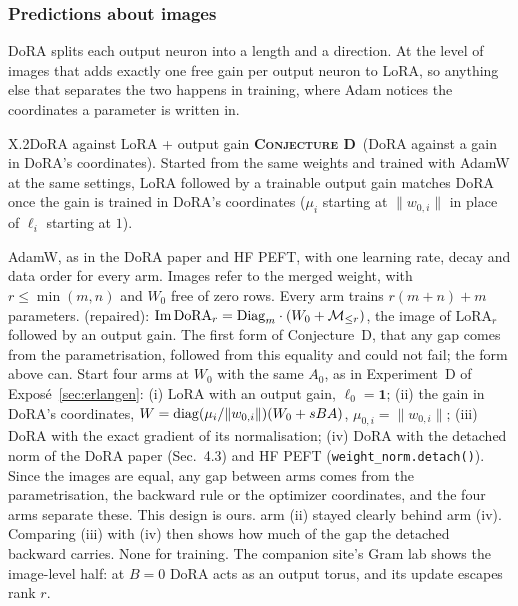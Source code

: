 \subsubsection{Predictions about images}\label{sec:predictions-images}

DoRA splits each output neuron into a length and a direction. At the level of images that adds exactly one free gain per
output neuron to LoRA, so anything else that separates the two happens in training, where Adam notices the coordinates a
parameter is written in.

\begin{prediction}{X.2}{DoRA against LoRA + output gain}
\label{res:D}{\bfseries\scshape Conjecture D}\ (DoRA against a gain in DoRA's
coordinates). Started from the same weights and trained with AdamW at the same settings, LoRA followed by a trainable
output gain matches DoRA \citep{liu2024dora} once the gain is trained in DoRA's coordinates ($\mu_i$ starting at
$\lVert w_{0,i}\rVert$ in place of $\ell_i$ starting at $1$).
\begin{predmeta}
   AdamW, as in the DoRA paper and HF PEFT, with one learning rate, decay and data order for every arm.
    Images refer to the merged weight, with $r\le\min(m,n)$ and $W_0$ free of zero rows. Every arm trains $r(m+n)+m$
    parameters.
    (repaired):
    $\operatorname{Im}\mathrm{DoRA}_r=\mathrm{Diag}_m\cdot(W_0+\mathcal{M}_{\le r})$, the image of $\mathrm{LoRA}_r$ followed by an output gain. The
    first form of Conjecture~D, that any gap comes from the parametrisation, followed from this equality and could not
    fail; the form above can.
   Start four arms at $W_0$ with the same $A_0$, as in Experiment~D of Exposé~\ref{sec:erlangen}:
    (i) LoRA with an output gain, $\ell_0=\mathbf 1$; (ii) the gain in DoRA's coordinates,
    $W=\operatorname{diag}(\mu_i/\lVert w_{0,i}\rVert)(W_0+sBA)$, $\mu_{0,i}=\lVert w_{0,i}\rVert$; (iii) DoRA with the exact gradient
    of its normalisation; (iv) DoRA with the detached norm of the DoRA paper (Sec.~4.3) and HF PEFT
    (\texttt{weight\_norm.detach()}). Since the images are equal, any gap between arms comes from the parametrisation,
    the backward rule or the optimizer coordinates, and the four arms separate these. This design is ours.
   arm (ii) stayed clearly behind arm (iv). Comparing (iii) with (iv) then shows how much of
    the gap the detached backward carries.
   None for training. The companion site's Gram lab shows the image-level half: at $B=0$ DoRA acts as an
    output torus, and its update escapes rank $r$.
\end{predmeta}
\end{prediction}

